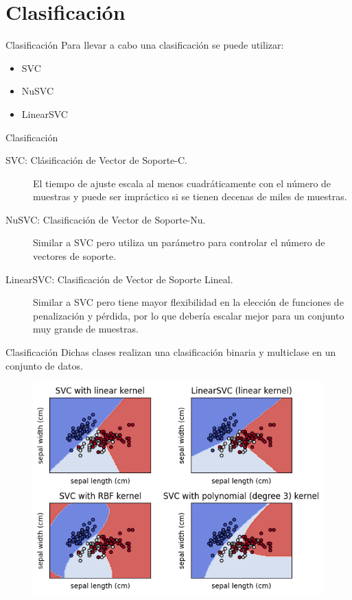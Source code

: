 \documentclass[11pt,aspectratio=169]{beamer}
\begin{document}
\section{Clasificación}
\begin{frame}{Clasificación}
  Para llevar a cabo una clasificación se puede utilizar: \pause
  \begin{itemize}
    \item SVC \pause
    \item NuSVC \pause
    \item LinearSVC 
  \end{itemize}
\end{frame}

\begin{frame}{Clasificación}
\begin{description}
  \item[SVC: Clásificación de Vector de Soporte-C.]  El tiempo de ajuste escala al menos cuadráticamente con el número de muestras 
    y puede ser impráctico si se tienen decenas de miles de muestras.\pause 
  \item[NuSVC: Clasificación de Vector de Soporte-Nu.] Similar a SVC pero utiliza un parámetro para controlar el número de vectores de soporte. \pause
  \item[LinearSVC: Clasificación de Vector de Soporte Lineal.] Similar a SVC pero tiene mayor flexibilidad en la elección de funciones de 
    penalización y pérdida, por lo que debería escalar mejor para un conjunto muy grande de muestras.
\end{description} 
\end{frame}

\begin{frame}{Clasificación}
  Dichas clases realizan una clasificación binaria y multiclase en un conjunto de datos.\pause
  \begin{figure}
    \centering
    \includegraphics[scale=0.5]{ML/701.png}
  \end{figure}
\end{frame}
\end{document}
